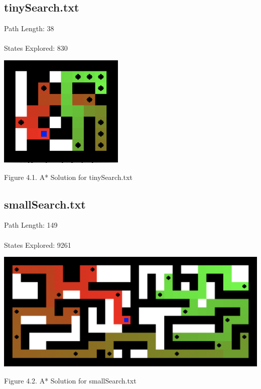 \documentclass{mcmthesis}
\begin{document}
\subsection{tinySearch.txt}

Path Length: 38 \\ \\
States Explored: 830
\begin{center}
\includegraphics[width=6cm]{tiny.png}
\end{center}
\begin{center}
\small{Figure 4.1. A* Solution for tinySearch.txt}
\end{center}

\subsection{smallSearch.txt}
Path Length: 149 \\ \\
States Explored: 9261
\begin{center}
\includegraphics[width=15cm]{small.png}
\end{center}
\begin{center}
\small{Figure 4.2. A* Solution for smallSearch.txt}
\end{center}
\end{document}
